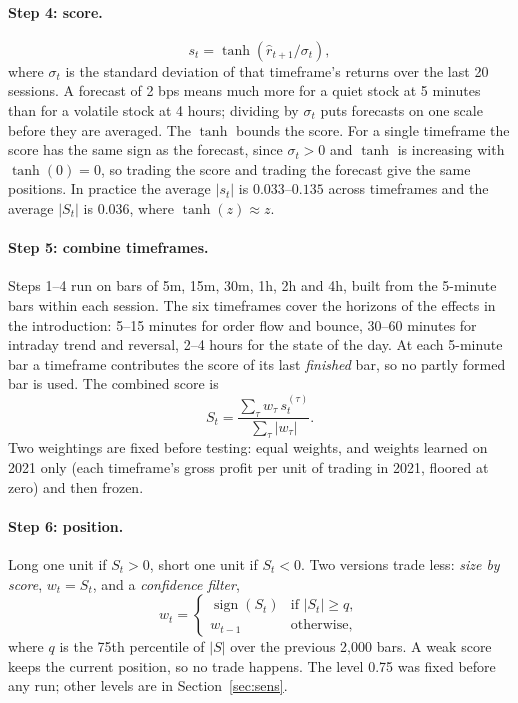 \documentclass[11pt,a4paper]{article}
\begin{document}
\paragraph{Step 4: score.}
\begin{equation}
s_t = \tanh(\hat r_{t+1}/\sigma_t),
\label{eq:score}
\end{equation}
where $\sigma_t$ is the standard deviation of that timeframe's returns over the last 20
sessions. A forecast of 2 bps means much more for a quiet stock at 5 minutes than for a volatile stock at
4 hours; dividing by $\sigma_t$ puts forecasts on one scale before they are averaged. The $\tanh$ bounds
the score. For a single timeframe the score has the same sign as the forecast, since $\sigma_t>0$ and
$\tanh$ is increasing with $\tanh(0)=0$, so trading the score and trading the forecast give the same
positions. In practice the average $|s_t|$ is $0.033$--$0.135$ across timeframes and the average
$|S_t|$ is $0.036$, where $\tanh(z)\approx z$.

\paragraph{Step 5: combine timeframes.} Steps 1--4 run on bars of 5m, 15m, 30m, 1h, 2h and 4h, built from
the 5-minute bars within each session. The six timeframes cover the horizons of the effects in the introduction:
5--15 minutes for order flow and bounce, 30--60 minutes for intraday trend and reversal, 2--4 hours for
the state of the day. At each 5-minute bar a timeframe contributes the score of its last \emph{finished}
bar, so no partly formed bar is used. The combined score is
\begin{equation}
S_t = \frac{\sum_\tau w_\tau\, s^{(\tau)}_t}{\sum_\tau |w_\tau|}.
\label{eq:mtf}
\end{equation}
Two weightings are fixed before testing: equal weights, and weights learned on 2021 only (each
timeframe's gross profit per unit of trading in 2021, floored at zero) and then frozen.

\paragraph{Step 6: position.} Long one unit if $S_t>0$, short one unit if $S_t<0$. Two versions trade less:
\emph{size by score}, $w_t=S_t$, and a \emph{confidence filter},
\[
w_t=\begin{cases}\operatorname{sign}(S_t) & \text{if } |S_t|\ge q,\\ w_{t-1} & \text{otherwise,}\end{cases}
\]
where $q$ is the 75th percentile of $|S|$ over the previous 2{,}000 bars. A weak score keeps
the current position, so no trade happens. The level 0.75 was fixed before any run; other levels are
in Section~\ref{sec:sens}.
\end{document}
